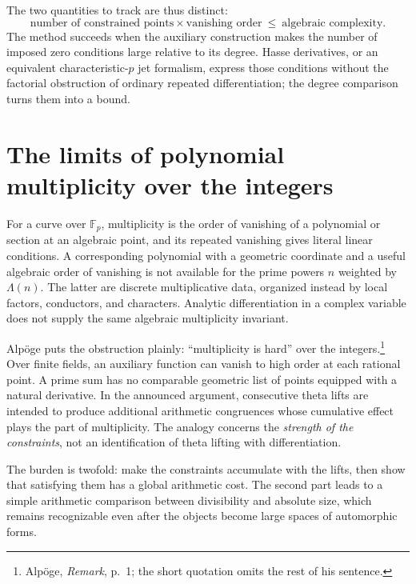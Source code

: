 \documentclass[11pt,openany,oneside]{scrbook}
\theoremstyle{definition}
\theoremstyle{remark}
\newcommand{\F}{\mathbb F}
\begin{document}
The two quantities to track are thus distinct:
\begin{equation}\label{eq:tradeoff}
\boxed{\text{number of constrained points}\times\text{vanishing order}
\ \le\ \text{algebraic complexity}.}
\end{equation}
The method succeeds when the auxiliary construction makes the number of imposed zero conditions large relative to its degree. Hasse derivatives, or an equivalent characteristic-$p$ jet formalism, express those conditions without the factorial obstruction of ordinary repeated differentiation; the degree comparison turns them into a bound.

\section{The limits of polynomial multiplicity over the integers}
For a curve over $\F_p$, multiplicity is the order of vanishing of a polynomial or section at an algebraic point, and its repeated vanishing gives literal linear conditions. A corresponding polynomial with a geometric coordinate and a useful algebraic order of vanishing is not available for the prime powers $n$ weighted by $\Lambda(n)$. The latter are discrete multiplicative data, organized instead by local factors, conductors, and characters. Analytic differentiation in a complex variable does not supply the same algebraic multiplicity invariant.

Alp\"oge puts the obstruction plainly: ``multiplicity is hard'' over the integers.\footnote{Alp\"oge, \emph{Remark}, p.~1; the short quotation omits the rest of his sentence.} Over finite fields, an auxiliary function can vanish to high order at each rational point. A prime sum has no comparable geometric list of points equipped with a natural derivative. In the announced argument, consecutive theta lifts are intended to produce additional arithmetic congruences whose cumulative effect plays the part of multiplicity. The analogy concerns the \emph{strength of the constraints}, not an identification of theta lifting with differentiation.

The burden is twofold: make the constraints accumulate with the lifts, then show that satisfying them has a global arithmetic cost. The second part leads to a simple arithmetic comparison between divisibility and absolute size, which remains recognizable even after the objects become large spaces of automorphic forms.
\end{document}
